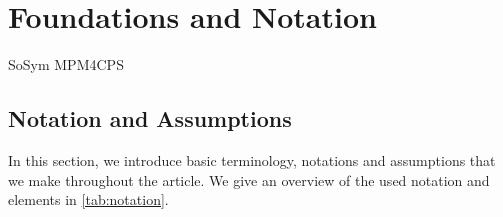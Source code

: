 \chapter{Foundations and Notation
}
\label{chap:foundations}

\begin{copiedFrom}{SoSym MPM4CPS}

\section{Notation and Assumptions}

In this section, we introduce basic terminology, notations and assumptions that we make throughout the article.
We give an overview of the used notation and elements in \autoref{tab:notation}.


\end{copiedFrom}
